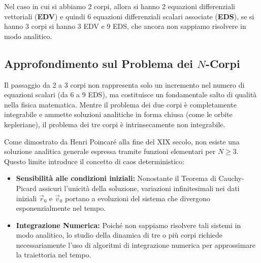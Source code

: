\documentclass[11pt, a4paper, openright]{book}
\theoremstyle{plain}
\theoremstyle{definition}
\begin{document}
Nel caso in cui si abbiamo 2 corpi, allora si hanno 2 equazioni differenziali vettoriali (\textbf{EDV}) e quindi 6 equazioni differenziali scalari associate (\textbf{EDS}), se si hanno 3 corpi si hanno 3 EDV e 9 EDS, che ancora non sappiamo risolvere in modo analitico.

\subsection{Approfondimento sul Problema dei $N$-Corpi}
Il passaggio da 2 a 3 corpi non rappresenta solo un incremento nel numero di equazioni scalari (da 6 a 9 EDS), ma costituisce un fondamentale salto di qualità nella fisica matematica. Mentre il problema dei due corpi è completamente integrabile e ammette soluzioni analitiche in forma chiusa (come le orbite kepleriane), il problema dei tre corpi è intrinsecamente non integrabile.

Come dimostrato da Henri Poincaré alla fine del XIX secolo, non esiste una soluzione analitica generale espressa tramite funzioni elementari per $N \geq 3$. Questo limite introduce il concetto di caos deterministico: 

\begin{itemize}
    \item \textbf{Sensibilità alle condizioni iniziali:} Nonostante il Teorema di Cauchy-Picard assicuri l'unicità della soluzione, variazioni infinitesimali nei dati iniziali $\vec{r}_0$ e $\vec{v}_0$ portano a evoluzioni del sistema che divergono esponenzialmente nel tempo.
    \item \textbf{Integrazione Numerica:} Poiché non sappiamo risolvere tali sistemi in modo analitico, lo studio della dinamica di tre o più corpi richiede necessariamente l'uso di algoritmi di integrazione numerica per approssimare la traiettoria nel tempo.
\end{itemize}
\end{document}
